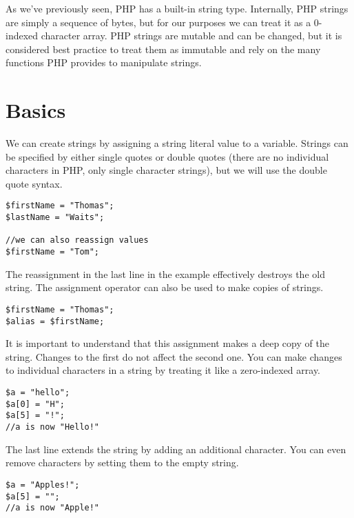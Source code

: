 

As we've previously seen, PHP has a built-in string type.
Internally, PHP strings are simply a sequence of bytes, 
but for our purposes we can treat it as a 0-indexed 
character array.  PHP strings are mutable and can be
changed, but it is considered best practice to treat
them as immutable and rely on the many functions PHP 
provides to manipulate strings.

\section{Basics}

We can create strings by assigning a string literal value 
to a variable.  Strings
can be specified by either single quotes or double
quotes (there are no individual characters in PHP, 
only single character strings), but we will
use the double quote syntax.

\begin{verbatim}
$firstName = "Thomas";
$lastName = "Waits";

//we can also reassign values
$firstName = "Tom";
\end{verbatim}

The reassignment in the last line in the example
effectively destroys the old string.  The assignment
operator can also be used to make copies of strings.

\begin{verbatim}
$firstName = "Thomas";
$alias = $firstName;
\end{verbatim}

It is important to understand that this assignment 
makes a \gls{deep copy} of the string.
Changes to the first do not affect the second one.
You can make changes to individual characters in a
string by treating it like a zero-indexed array.

\begin{verbatim}
$a = "hello";
$a[0] = "H";
$a[5] = "!";
//a is now "Hello!"
\end{verbatim}

The last line extends the string by adding
an additional character.  You can even remove characters
by setting them to the empty string.

\begin{verbatim}
$a = "Apples!";
$a[5] = "";
//a is now "Apple!"
\end{verbatim}

